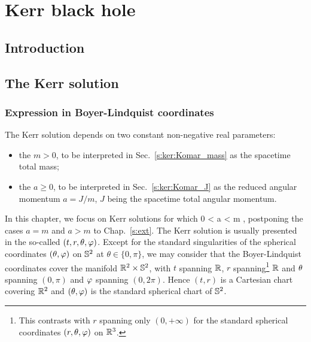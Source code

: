 \chapter{Kerr black hole}
\label{s:ker}

\minitoc

\section{Introduction}

\section{The Kerr solution}

\subsection{Expression in Boyer-Lindquist coordinates} \label{s:ker:expr_BL}

The Kerr solution depends on two constant non-negative real parameters:
\begin{itemize}
\item the  $m > 0$, to be
interpreted in Sec.~\ref{s:ker:Komar_mass} as the spacetime total mass;
\item the  $a \geq 0 $,
to be interpreted in Sec.~\ref{s:ker:Komar_J} as the reduced angular momentum  $a=J/m$, $J$ being the
spacetime total angular momentum.
\end{itemize}
In this chapter, we focus on Kerr solutions for which
\be \label{e:ker:a_lower_m}
    0 < a < m ,
\ee
postponing the cases $a=m$ and $a>m$ to Chap.~\ref{s:ext}.
The Kerr solution is usually presented in the so-called
$(t,r,\theta,\varphi)$. Except for the standard singularities of the
spherical coordinates $(\theta,\varphi)$ on $\mathbb{S}^2$ at $\theta\in\{0,\pi\}$,
we may consider that the Boyer-Lindquist coordinates cover the manifold
$\mathbb{R}^2\times\mathbb{S}^2$, with $t$ spanning $\mathbb{R}$, $r$
spanning\footnote{This contrasts with $r$ spanning only $(0,+\infty)$ for
the standard spherical coordinates $(r,\theta,\varphi)$ on $\mathbb{R}^3$.} $\mathbb{R}$ and
$\theta$ spanning $(0,\pi)$ and $\varphi$ spanning $(0,2\pi)$. Hence
$(t,r)$ is a Cartesian chart covering $\mathbb{R}^2$ and $(\theta,\varphi)$ is the standard
spherical chart of $\mathbb{S}^2$.

